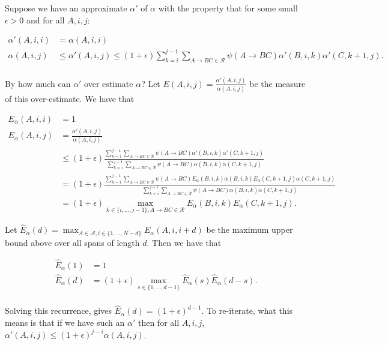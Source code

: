 \documentclass{article}
\begin{document}
Suppose we have an approximate $\alpha'$ of $\alpha$ with the
property that for some small $\epsilon > 0$ and for all $A, i, j$: 

\begin{align}
\alpha'(A, i, i) &= \alpha(A, i, i)\\ 
\alpha(A, i, j) &\leq \alpha'(A, i, j) \leq (1+\epsilon)  \sum_{k=i}^{j-1} \sum_{A \rightarrow B C \in \mathcal{R}} 
  \psi(A \rightarrow B C ) \alpha'(B, i, k) \alpha'(C, k+1, j).\\
\end{align}

By how much can $\alpha'$ over estimate $\alpha$? Let $E(A, i,
j)=\frac{\alpha'(A, i, j)}{\alpha(A, i, j)}$ be the measure of this
over-estimate. We have that 

\begin{align}
E_{\alpha}(A, i, i) &= 1\\
E_{\alpha}(A, i,j) &= \frac{\alpha'(A, i, j)}{\alpha(A, i, j)}\\
          &\leq (1+\epsilon) \frac{ \sum_{k=i}^{j-1} \sum_{A \rightarrow B C \in \mathcal{R}} 
  \psi(A \rightarrow B C ) \alpha'(B, i, k) \alpha'(C, k+1, j)}
           {\sum_{k=i}^{j-1} \sum_{A \rightarrow B C \in \mathcal{R}}
  \psi(A \rightarrow B C ) \alpha(B, i, k) \alpha(C, k+1, j)}\\
          &=  (1+\epsilon) \frac{ \sum_{k=i}^{j-1} \sum_{A \rightarrow B C \in \mathcal{R}} 
  \psi(A \rightarrow B C ) E_{\alpha}(B, i, k) \alpha(B, i, k) E_{\alpha}(C, k+1, j) \alpha(C, k+1, j)}
           {\sum_{k=i}^{j-1} \sum_{A \rightarrow B C \in \mathcal{R}}
  \psi(A \rightarrow B C ) \alpha(B, i, k) \alpha(C, k+1, j)}\\
         &= (1+\epsilon) \max_{k\in \{i, \dots, j-1\}, A \rightarrow B C \in \mathcal{R} }
            E_{\alpha}(B, i, k) E_{\alpha}(C, k+1, j).
\end{align}

Let $\hat{E}_{\alpha}(d) = \max_{A\in\mathcal{A}, i \in \{1, \dots, N-d \}}
E_{\alpha}(A, i, i+d)$ be the maximum upper bound above over all spans of
length $d$. Then we have that

\begin{align}
\hat{E}_{\alpha}(1) &= 1\\
\hat{E}_{\alpha}(d) &= (1+\epsilon) \max_{s \in \{1, \dots, d-1\}} \hat{E}_{\alpha}(s) \hat{E}_{\alpha}(d-s).\\
\end{align}

Solving this recurrence, gives $\hat{E}_{\alpha}(d) = (1 + \epsilon)^{d-1}$. To
re-iterate, what this means is that if we have such an $\alpha'$ then
for all $A, i, j$, $\alpha'(A, i, j) \leq (1 + \epsilon)^{j - i}
\alpha(A, i, j)$.
\end{document}
